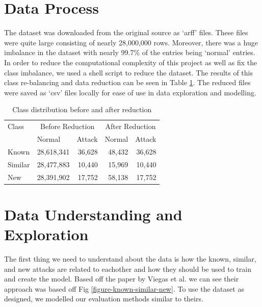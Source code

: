 \section{Data Process}
The dataset was downloaded from the original source as `arff' files. These files were quite large consisting of nearly 28,000,000 rows. Moreover, there was a huge imbalance in the dataset with nearly 99.7\% of the entries being `normal' entries. In order to reduce the computational complexity of this project as well as fix the class imbalance, we used a shell script to reduce the dataset. The results of this class re-balancing and data reduction can be seen in Table \ref{table-class-distribution}. The reduced files were saved as `csv' files locally for ease of use in data exploration and modelling. 

\begin{table}[!htb]
    \centering
    \caption{Class distribution before and after reduction}
    \label{table-class-distribution}
    \begin{tabular}{llrrr}
         \toprule
Class&   \multicolumn{2}{c}{Before Reduction}& \multicolumn{2}{c}{After Reduction}\\
&  Normal& Attack& Normal&Attack\\
\midrule
Known & 28,618,341& 36,628& 48,432&36,628\\
Similar & 28,477,883& 10,440& 15,969&10,440\\
New & 28,391,902& 17,752& 58,138&17,752\\
\bottomrule
\end{tabular}
\end{table}

\section{Data Understanding and Exploration}
The first thing we need to understand about the data is how the known, similar, and new attacks are related to eachother and how they should be used to train and create the model. Based off the paper by Viegas et al. we can see their approach was based off Fig \ref{figure-known-similar-new}.\cite{viegas2017toward} To use the dataset as designed, we modelled our evaluation methods similar to theirs.

